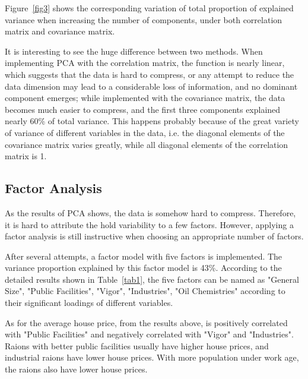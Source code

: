 \documentclass{article}
\begin{document}
Figure~\ref{fig3} shows the corresponding variation of total proportion of explained variance when increasing the number of components, under both correlation matrix and covariance matrix.

It is interesting to see the huge difference between two methods. When implementing PCA with the correlation matrix, the function is nearly linear, which suggests that the data is hard to compress, or any attempt to reduce the data dimension may lead to a considerable loss of information, and no dominant component emerges; while implemented with the covariance matrix, the data becomes much easier to compress, and the first three components explained nearly 60\% of total variance. This happens probably because of the great variety of variance of different variables in the data, i.e. the diagonal elements of the covariance matrix varies greatly, while all diagonal elements of the correlation matrix is 1.

\subsection{Factor Analysis}

As the results of PCA shows, the data is somehow hard to compress. Therefore, it is hard to attribute the hold variability to a few factors. However, applying a factor analysis is still instructive when choosing an appropriate number of factors.

After several attempts, a factor model with five factors is implemented. The variance proportion explained by this factor model is 43\%. According to the detailed results shown in Table~\ref{tab1}, the five factors can be named as "General Size", "Public Facilities", "Vigor", "Industries", "Oil Chemistries" according to their significant loadings of different variables.

\label{FA}

As for the average house price, from the results above, is positively correlated with "Public Facilities" and negatively correlated with "Vigor" and "Industries". Raions with better public facilities usually have higher house prices, and industrial raions have lower house prices. With more population under work age, the raions also have lower house prices.
\end{document}
